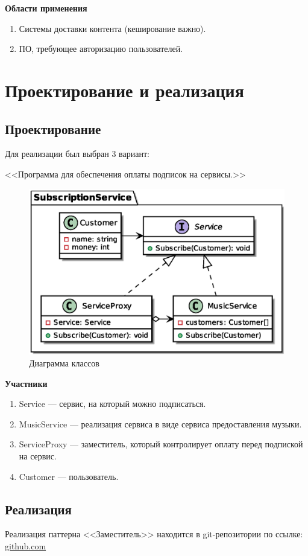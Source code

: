 \documentclass[PI,LAB]{HSEUniversity}
\begin{document}
\textbf{Области применения}

\begin{enumerate}
	\item Системы доставки контента (кеширование важно).
	\item ПО, требующее авторизацию пользователей.
\end{enumerate}

\chapter{Проектирование и реализация}
\section{Проектирование}
Для реализации был выбран 3 вариант:

<<Программа для обеспечения оплаты подписок на сервисы.>>

 \begin{figure}[h]
   \centering
   \includegraphics[scale=0.75]{Task_CD.eps}
   \caption{Диаграмма классов}
   \label{fig:Task_CD}
 \end{figure}

\textbf{Участники}

\begin{enumerate}
	\item Service --- сервис, на который можно подписаться.
	\item MusicService --- реализация сервиса в виде сервиса предоставления музыки.
	\item ServiceProxy --- заместитель, который контролирует оплату перед подпиской на сервис.
	\item Customer --- пользователь.
\end{enumerate}

\section{Реализация}
Реализация паттерна <<Заместитель>> находится в git-репозитории по ссылке: \href{https://github.com/rovany706/design-patterns/tree/master/Proxy/src/com/Proxy}{github.com}
\end{document}
